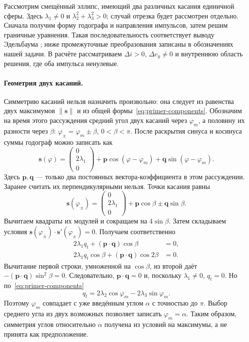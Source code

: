 Рассмотрим смещённый эллипс, имеющий два различных касания
единичной сферы. Здесь $\lambda_1\ne0$ и
$\lambda_2^2+\lambda_3^2>0$; случай отрезка будет рассмотрен отдельно.
Сначала получим форму годографа и направления импульсов, затем
решим граничные уравнения. Такая последовательность соответствует
выводу Эдельбаума \cite[с.~43--44, 48--53]{edelbaum}; ниже
промежуточные преобразования записаны в обозначениях нашей задачи.
В расчёте рассматриваем $\Delta i>0$, $\Delta e_y\ne0$ и внутреннюю
область решения, где оба импульса ненулевые.

\paragraph{Геометрия двух касаний.}
Симметрию касаний нельзя назначить произвольно: она следует
из равенства двух максимумов $\|\boldsymbol s\|$ и из общей
формы~\eqref{eq:primer-components}.
Обозначим на время этого рассуждения средний угол двух касаний
через $\varphi_m$, а половину их разности через $\beta$:
$\varphi_\pm=\varphi_m\pm\beta$, $0<\beta<\pi$.
После раскрытия синуса и косинуса суммы годограф можно записать как
\[
 \boldsymbol s(\varphi)=
 \begin{pmatrix}0\\2\lambda_1\\0\end{pmatrix}
 +\boldsymbol p\cos(\varphi-\varphi_m)
 +\boldsymbol q\sin(\varphi-\varphi_m).
\]
Здесь $\boldsymbol p,\boldsymbol q$ --- только два постоянных
вектора-коэффициента в этом рассуждении. Заранее считать их
перпендикулярными нельзя. Точки касания равны
\[
 \boldsymbol s(\varphi_\pm)=
 \begin{pmatrix}0\\2\lambda_1\\0\end{pmatrix}
 +\boldsymbol p\cos\beta\pm\boldsymbol q\sin\beta.
\]
Вычитаем квадраты их модулей и сокращаем на $4\sin\beta$.
Затем складываем условия
$\boldsymbol s(\varphi_\pm)\cdot\boldsymbol s'(\varphi_\pm)=0$.
Получаем соответственно
\[
 \begin{aligned}
 2\lambda_1q_t+(\boldsymbol p\cdot\boldsymbol q)\cos\beta&=0,\\
 2\lambda_1q_t\cos\beta+
       (\boldsymbol p\cdot\boldsymbol q)\cos2\beta&=0.
 \end{aligned}
\]
Вычитание первой строки, умноженной на $\cos\beta$, из второй даёт
$-(\boldsymbol p\cdot\boldsymbol q)\sin^2\beta=0$.
Следовательно, $\boldsymbol p\cdot\boldsymbol q=0$ и, поскольку
$\lambda_1\ne0$, $q_t=0$. Но по~\eqref{eq:primer-components}
\[
 q_t=2\lambda_2\cos\varphi_m-2\lambda_3\sin\varphi_m.
\]
Поэтому $\varphi_m$ совпадает с уже введённым углом $\alpha$
с точностью до $\pi$. Выбор среднего угла из двух возможных
позволяет записать $\varphi_m=\alpha$.
Таким образом, симметрия углов относительно $\alpha$ получена
из условий на максимумы, а не принята как предположение.


